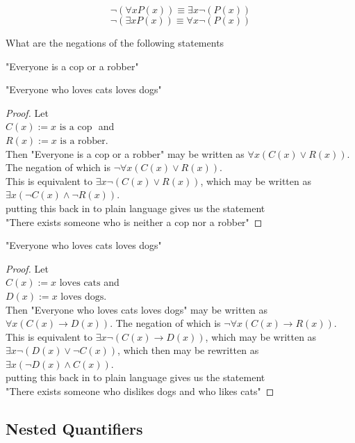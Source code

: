 \begin{defn}

\[\lnot (\forall x P(x)) \equiv \exists x \lnot( P(x))\]
\[\lnot (\exists x P(x)) \equiv \forall x \lnot( P(x))\]

\end{defn}
\begin{exmp}

What are the negations of the following statements

"Everyone is a cop or a robber"

"Everyone who loves cats loves dogs"
\end{exmp}
\begin{proof}
Let 
\\$C(x):=\text{$x$ is a cop }$ and
\\$R(x):=\text{$x$ is a robber}$.
\\Then "Everyone is a cop or a robber" may be written as $\forall x (C(x) \lor R(x))$.
The negation of which is $\lnot \forall x (C(x) \lor R(x))$.
\\ This is equivalent to $\exists x \lnot (C(x) \lor R(x))$, which may be written as $\exists x (\lnot C(x) \land \lnot R(x))$.
\\ putting this back in to plain language gives us the statement
\\"There exists someone who is neither a cop nor a robber"
\end{proof}
"Everyone who loves cats loves dogs"
\begin{proof}
Let 
\\$C(x):=\text{$x$ loves cats}$ and
\\$D(x):=\text{$x$ loves dogs}$.
\\Then "Everyone who loves cats loves dogs" may be written as $\forall x (C(x) \to D(x))$.
The negation of which is $\lnot \forall x (C(x) \to R(x))$.
\\ This is equivalent to $\exists x \lnot (C(x) \to D(x))$, which may be written as $\exists x \lnot ( D(x) \lor \lnot C(x) )$, which then may be rewritten as $\exists x ( \lnot D(x) \land C(x) )$.
\\ putting this back in to plain language gives us the statement
\\"There exists someone who dislikes dogs and who likes cats"
\end{proof}

\subsection{Nested Quantifiers}

